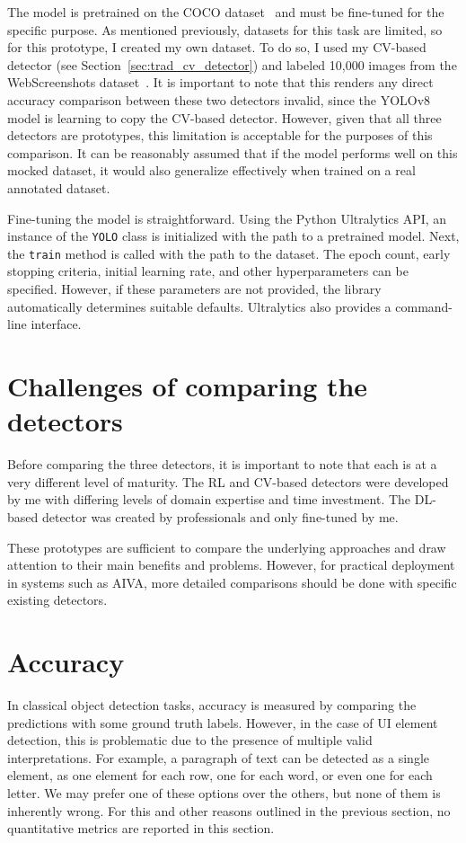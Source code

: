 \documentclass[
  digital,     %
  oneside,     %
  nosansbold,  %
  nocolorbold, %
  lof,         %
  lot,         %
]{fithesis4}
\begin{document}
The model is pretrained on the COCO dataset~\cite{COCO} and must be fine-tuned for the specific purpose. As mentioned previously, datasets for this task are limited, so for this prototype, I created my own dataset. To do so, I used my CV-based detector (see Section~\ref{sec:trad_cv_detector}) and labeled 10,000 images from the WebScreenshots dataset~\cite{aydos2020}. It is important to note that this renders any direct accuracy comparison between these two detectors invalid, since the YOLOv8 model is learning to copy the CV-based detector. However, given that all three detectors are prototypes, this limitation is acceptable for the purposes of this comparison. It can be reasonably assumed that if the model performs well on this mocked dataset, it would also generalize effectively when trained on a real annotated dataset.

Fine-tuning the model is straightforward. Using the Python Ultralytics API, an instance of the \texttt{YOLO} class is initialized with the path to a pretrained model. Next, the \texttt{train} method is called with the path to the dataset. The epoch count, early stopping criteria, initial learning rate, and other hyperparameters can be specified. However, if these parameters are not provided, the library automatically determines suitable defaults. Ultralytics also provides a command-line interface.

\section{Challenges of comparing the detectors}

Before comparing the three detectors, it is important to note that each is at a very different level of maturity. The RL and CV-based detectors were developed by me with differing levels of domain expertise and time investment. The DL-based detector was created by professionals and only fine-tuned by me.

These prototypes are sufficient to compare the underlying approaches and draw attention to their main benefits and problems. However, for practical deployment in systems such as AIVA, more detailed comparisons should be done with specific existing detectors.

\section{Accuracy}

In classical object detection tasks, accuracy is measured by comparing the predictions with some ground truth labels. However, in the case of UI element detection, this is problematic due to the presence of multiple valid interpretations. For example, a paragraph of text can be detected as a single element, as one element for each row, one for each word, or even one for each letter. We may prefer one of these options over the others, but none of them is inherently wrong. For this and other reasons outlined in the previous section, no quantitative metrics are reported in this section.
\end{document}
